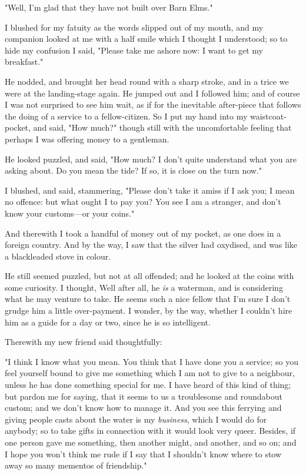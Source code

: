"Well, I'm glad that they have not built over Barn Elms."

I blushed for my fatuity as the words slipped out of my mouth, and my
companion looked at me with a half smile which I thought I understood;
so to hide my confusion I said, "Please take me ashore now: I want to
get my breakfast."

He nodded, and brought her head round with a sharp stroke, and in a
trice we were at the landing-stage again. He jumped out and I followed
him; and of course I was not surprised to see him wait, as if for the
inevitable after-piece that follows the doing of a service to a
fellow-citizen. So I put my hand into my waistcoat-pocket, and said,
"How much?" though still with the uncomfortable feeling that perhaps I
was offering money to a gentleman.

He looked puzzled, and said, "How much? I don't quite understand what
you are asking about. Do you mean the tide? If so, it is close on the
turn now."

I blushed, and said, stammering, "Please don't take it amiss if I ask
you; I mean no offence: but what ought I to pay you? You see I am a
stranger, and don't know your customs---or your coins."

And therewith I took a handful of money out of my pocket, as one does in
a foreign country. And by the way, I saw that the silver had oxydised,
and was like a blackleaded stove in colour.

He still seemed puzzled, but not at all offended; and he looked at the
coins with some curiosity. I thought, Well after all, he \emph{is} a
waterman, and is considering what he may venture to take. He seems such
a nice fellow that I'm sure I don't grudge him a little over-payment. I
wonder, by the way, whether I couldn't hire him as a guide for a day or
two, since he is so intelligent.

Therewith my new friend said thoughtfully:

"I think I know what you mean. You think that I have done you a service;
so you feel yourself bound to give me something which I am not to give
to a neighbour, unless he has done something special for me. I have
heard of this kind of thing; but pardon me for saying, that it seems to
us a troublesome and roundabout custom; and we don't know how to manage
it. And you see this ferrying and giving people casts about the water is
my \emph{business}, which I would do for anybody; so to take gifts in
connection with it would look very queer. Besides, if one person gave me
something, then another might, and another, and so on; and I hope you
won't think me rude if I say that I shouldn't know where to stow away so
many mementos of friendship."

